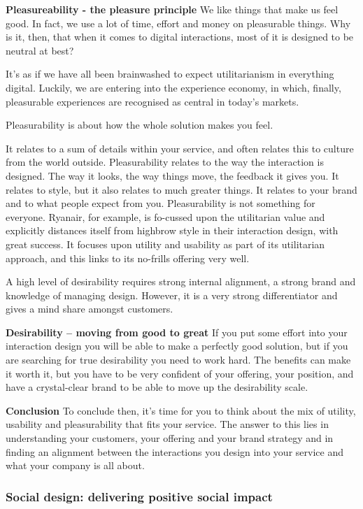 \textbf{Pleasureability - the pleasure principle}
We like things that make us feel good. In fact, we use a lot of time, effort and money on pleasurable things. Why is it, then, that when it comes to digital interactions, most of it is designed to be neutral at best?

It’s as if we have all been brainwashed to expect utilitarianism in everything digital. Luckily, we are entering into the experience economy, in which, finally, pleasurable experiences are recognised as central in today’s markets.

Pleasurability is about how the whole solution makes you feel.


It relates to a sum of details within your service, and often relates this to culture from the world outside. Pleasurability relates to the way the interaction is designed. The way it looks, the way things move, the feedback it gives you. It relates to style, but it also relates to much greater things. It relates to your brand and to what people expect from you. Pleasurability is not something for everyone. Ryanair, for example, is fo-cussed upon the utilitarian value and explicitly distances itself from highbrow style in their interaction design, with great success. It focuses upon utility and usability as part of its utilitarian approach, and this links to its no-frills offering very well.

A high level of desirability requires strong internal alignment, a strong brand and knowledge of managing design. However, it is a very strong differentiator and gives a mind share amongst customers.

\textbf{Desirability – moving from good to great}
If you put some effort into your interaction design you will be able to make a perfectly good solution, but if you are searching for true desirability you need to work hard. The benefits can make it worth it, but you have to be very confident of your offering, your position, and have a crystal-clear brand to be able to move up the desirability scale.

\textbf{Conclusion}
To conclude then, it’s time for you to think about the mix of utility, usability and pleasurability that fits your service. The answer to this lies in understanding your customers, your offering and your brand strategy and in finding an alignment between the interactions you design into your service and what your company is all about.

\subsubsection{Social design: delivering positive social impact}

